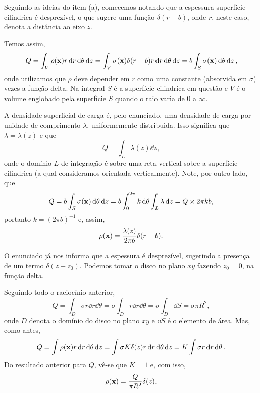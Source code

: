 
Seguindo as ideias do item (a), comecemos notando que a espessura superfície cilindrica é desprezível, o que sugere uma função $\delta(r - b)$, onde $r$, neste caso, denota a distância ao eixo $z$.

Temos assim,
\[
  Q = \int_V \rho(\vb{x}) r \dd{r} \dd{\theta} \dd{z} = \int_V \sigma(\vb{x}) \delta(r - b) r \dd{r} \dd{\theta} \dd{z} = b \int_S \sigma(\vb{x}) \dd{\theta} \dd{z},
\]
onde utilizamos que $\rho$ deve depender em $r$ como uma constante (absorvida em $\sigma$) vezes a função delta. Na integral $S$ é a superfície cilindrica em questão e $V$ é o volume englobado pela superfície $S$ quando o raio varia de $0$ a $\infty$.

A densidade superficial de carga é, pelo enunciado, uma densidade de carga por unidade de comprimento $\lambda$, uniformemente distribuida. Isso significa que $\lambda = \lambda(z)$ e que
\[
  Q = \int_L \lambda(z) \dd{z},
\]
onde o domínio $L$ de integração é sobre uma reta vertical sobre a superfície cilindrica (a qual consideramos orientada verticalmente). Note, por outro lado, que
\[
  Q = b\int_S \sigma(\vb{x}) \dd{\theta} \dd{z} = b\int_0^{2\pi} k \dd{\theta} \int_L \lambda \dd{z} = Q \times 2\pi k b,
\]
portanto $k = (2\pi b)^{-1}$ e, assim,
\begin{equation*}
  \rho(\vb{x}) = \frac{\lambda(z)}{2\pi b} \delta(r - b).
\end{equation*}



O enunciado já nos informa que a espessura é desprezível, sugerindo a presença de um termo $\delta(z - z_0)$. Podemos tomar o disco no plano $xy$ fazendo $z_0 = 0$, na função delta.

Seguindo todo o raciocínio anterior,
\begin{equation*}
  Q = \int_D \sigma r \dd{r} \dd{\theta} = \sigma \int_D r \dd{r} \dd{\theta} = \sigma \int_D \dd{S} = \sigma \pi R^2,
\end{equation*}
onde $D$ denota o domínio do disco no plano $xy$ e $\dd{S}$ é o elemento de área. Mas, como antes,
\[
  Q = \int \rho(\vb{x}) r\dd{r}\dd{\theta} \dd{z} = \int \sigma K \delta(z) r\dd{r}\dd{\theta} \dd{z} = K \int \sigma r\dd{r}\dd{\theta}.
\]
Do resultado anterior para $Q$, vê-se que $K = 1$ e, com isso,
\begin{equation*}
  \rho(\vb{x}) = \frac{Q}{\pi R^2} \delta(z).
\end{equation*}



